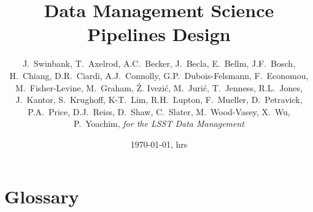 \documentclass[DM,lsstdraft,toc]{lsstdoc}
\title{Data Management Science Pipelines Design}
\author{
    J.~Swinbank, 
    T.~Axelrod,  A.C.~Becker, J.~Becla, E.~Bellm,
    J.F.~Bosch,  H.~Chiang, D.R.~Ciardi,  A.J.~Connolly,  G.P.~Dubois-Felsmann,
    F.~Economou, M.~Fisher-Levine, M.~Graham, \v{Z}. Ivezi\'c,  M.~Juri\'c,
    T.~Jenness,  R.L.~Jones, J.~Kantor, S.~Krughoff, K-T.~Lim, R.H.~Lupton, 
    F.~Mueller,  D.~Petravick, P.A.~Price,  D.J.~Reiss, D.~Shaw, C.~Slater,
    M.~Wood-Vasey, X.~Wu, P.~Yoachim,
     \emph{for the LSST Data Management}
}
\date{\today, \currenttime hrs}
\begin{document}
\maketitle













\section{Glossary}
\end{document}
